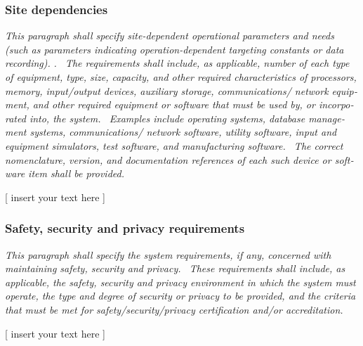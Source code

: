 \documentclass[twoside,letterpaper]{article}
\begin{document}
\subsubsection[Site
dependencies]{\rmfamily\bfseries\color{black}
Site dependencies}
{\color{black}
\foreignlanguage{english}{\textit{This paragraph shall specify
site-dependent operational parameters and needs (such as parameters
indicating operation-dependent targeting constants or data
recording).}}\foreignlanguage{english}{
}\foreignlanguage{english}{\textit{. \ The requirements shall include,
as applicable, number of each type of equipment, type, size, capacity,
and other required characteristics of processors, memory, input/output
devices, auxiliary storage, communications/ network equipment, and
other required equipment or software that must be used by, or
incorporated into, the system. \ Examples include operating systems,
database management systems, communications/ network software, utility
software, input and equipment simulators, test software, and
manufacturing software. \ The correct nomenclature, version, and
documentation references of each such device or software item shall be
provided.}}}

{\color{black}
[ insert your text here ]}

\subsubsection[Safety, security and privacy
requirements]{\rmfamily\bfseries\color{black}
Safety, security and privacy requirements}
{\itshape\color{black}
This paragraph shall specify the system requirements, if any, concerned
with maintaining safety, security and privacy. \ These requirements
shall include, as applicable, the safety, security and privacy
environment in which the system must operate, the type and degree of
security or privacy to be provided, and the criteria that must be met
for safety/security/privacy certification and/or accreditation.}

{\color{black}
[ insert your text here ]}
\end{document}
